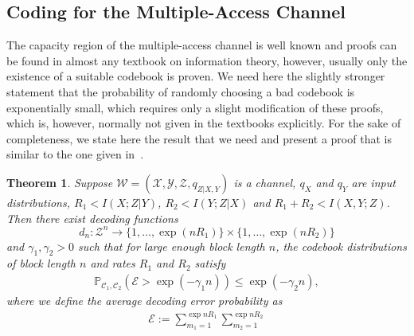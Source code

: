 \documentclass[journal]{IEEEtran}
\newcommand{\channelpmf}{q}
\newcommand{\codebookRateOne}{R_1}
\newcommand{\codebookRateTwo}{R_2}
\newcommand{\channelInOne}{X}
\newcommand{\channelInOneAlph}{\mathcal{X}}
\newcommand{\channelInTwo}{Y}
\newcommand{\channelInTwoAlph}{\mathcal{Y}}
\newcommand{\channelOut}{Z}
\newcommand{\channelOutAlph}{\mathcal{Z}}
\newcommand{\channel}{\mathcal{W}}
\newcommand{\codebookOne}{\mathcal{C}_1}
\newcommand{\codebookTwo}{\mathcal{C}_2}
\newcommand{\codewordIndex}{m}
\newcommand{\codebookBlocklength}{n}
\newcommand{\mutualInformation}[2]{I(#1;#2)}
\newcommand{\mutualInformationConditional}[3]{I(#1;#2|#3)}
\newcommand{\finalconstOne}{\gamma_1}
\newcommand{\finalconstTwo}{\gamma_2}
\newcommand{\Probability}{\mathbb{P}}
\newcommand{\codebookDecoder}{d}
\newcommand{\errorprob}{\mathcal{E}}
\newtheorem{theorem}{Theorem}
\begin{document}
\subsection{Coding for the Multiple-Access Channel}
\label{sec:secrecy-mac-coding}
The capacity region of the multiple-access channel is well known and proofs can be found in almost any textbook on information theory, however, usually only the existence of a suitable codebook is proven. We need here the slightly stronger statement that the probability of randomly choosing a bad codebook is exponentially small, which requires only a slight modification of these proofs, which is, however, normally not given in the textbooks explicitly. For the sake of completeness, we state here the result that we need and present a proof that is similar to the one given in~\cite{TeInformationSpectrum}.
\begin{theorem}
\label{theorem:mac-coding}
Suppose
$\channel = (\channelInOneAlph, \channelInTwoAlph, \channelOutAlph, \channelpmf_{\channelOut | \channelInOne, \channelInTwo})$
is a channel, $\channelpmf_\channelInOne$ and $\channelpmf_\channelInTwo$ are input distributions, $\codebookRateOne < \mutualInformationConditional{\channelInOne}{\channelOut}{\channelInTwo}$, $\codebookRateTwo < \mutualInformationConditional{\channelInTwo}{\channelOut}{\channelInOne}$ and $\codebookRateOne+\codebookRateTwo < \mutualInformation{\channelInOne,\channelInTwo}{\channelOut}$.
Then there exist decoding functions
\[
\codebookDecoder_\codebookBlocklength: \channelOutAlph^\codebookBlocklength
                                       \rightarrow
                                       \{1, \dots, \exp(\codebookBlocklength\codebookRateOne)\} \times \{1, \dots, \exp(\codebookBlocklength\codebookRateTwo)\}
\]
and $\finalconstOne, \finalconstTwo > 0$ such that for large enough block length $\codebookBlocklength$, the codebook distributions of block length $\codebookBlocklength$ and rates $\codebookRateOne$ and $\codebookRateTwo$ satisfy
\begin{align}
\label{theorem:mac-coding-probability-statement}
\Probability_{\codebookOne, \codebookTwo} \left(
  \errorprob
  >
  \exp(-\finalconstOne\codebookBlocklength)
\right)
\leq
\exp\left(-\finalconstTwo\codebookBlocklength\right),
\end{align}
where we define the \emph{average decoding error probability} as
\begin{align*}
\errorprob
:=
\sum\limits_{\codewordIndex_1=1}^{\exp{\codebookBlocklength\codebookRateOne}}
\sum\limits_{\codewordIndex_2=1}^{\exp{\codebookBlocklength\codebookRateTwo}}

\end{align*}
\end{theorem}
\end{document}
